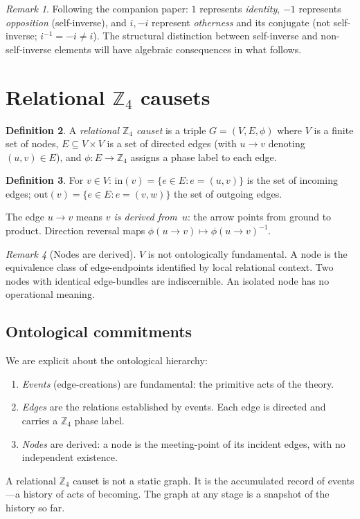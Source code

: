 \documentclass[11pt,a4paper]{article}
\theoremstyle{definition}
\newtheorem{definition}{Definition}[section]
\theoremstyle{plain}
\theoremstyle{remark}
\newtheorem{remark}[definition]{Remark}
\newcommand{\Zf}{\mathbb{Z}_4}
\newcommand{\inp}{\mathrm{in}}
\newcommand{\out}{\mathrm{out}}
\begin{document}
\begin{remark}
  Following the companion paper: $1$ represents \emph{identity}, $-1$ represents \emph{opposition} (self-inverse), and $i, -i$ represent \emph{otherness} and its conjugate (not self-inverse; $i^{-1} = -i \neq i$).  The structural distinction between self-inverse and non-self-inverse elements will have algebraic consequences in what follows.
\end{remark}

\section{Relational $\Zf$ causets}\label{sec:causets}

\begin{definition}\label{def:causet}
  A \emph{relational $\Zf$ causet} is a triple $G = (V, E, \phi)$ where $V$ is a finite set of nodes, $E \subseteq V \times V$ is a set of directed edges (with $u \to v$ denoting $(u,v) \in E$), and $\phi: E \to \Zf$ assigns a phase label to each edge.
\end{definition}

\begin{definition}\label{def:incidence}
  For $v \in V$: $\inp(v) = \{e \in E : e = (u, v)\}$ is the set of incoming edges; $\out(v) = \{e \in E : e = (v, w)\}$ the set of outgoing edges.
\end{definition}

The edge $u \to v$ means \emph{$v$ is derived from~$u$}: the arrow points from ground to product.  Direction reversal maps $\phi(u \to v) \mapsto \phi(u \to v)^{-1}$.

\begin{remark}[Nodes are derived]\label{rmk:derived}
  $V$ is not ontologically fundamental.  A node is the equivalence class of edge-endpoints identified by local relational context.  Two nodes with identical edge-bundles are indiscernible.  An isolated node has no operational meaning.
\end{remark}

\subsection{Ontological commitments}\label{sec:ontcommit}

We are explicit about the ontological hierarchy:
\begin{enumerate}[nosep]
  \item \emph{Events} (edge-creations) are fundamental: the primitive acts of the theory.
  \item \emph{Edges} are the relations established by events.  Each edge is directed and carries a $\Zf$ phase label.
  \item \emph{Nodes} are derived: a node is the meeting-point of its incident edges, with no independent existence.
\end{enumerate}
A relational $\Zf$ causet is not a static graph.  It is the accumulated record of events---a history of acts of becoming.  The graph at any stage is a snapshot of the history so far.
\end{document}
